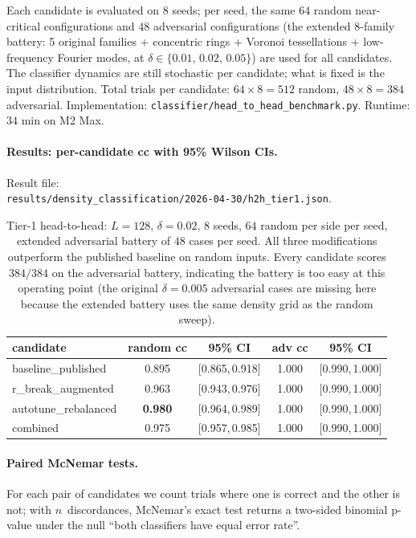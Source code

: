 \documentclass[11pt,a4paper]{article}
\newcommand{\fpath}[1]{\nolinkurl{#1}}
\begin{document}
Each candidate is evaluated on \(8\) seeds; per seed, the same
\(64\) random near-critical configurations and \(48\) adversarial
configurations (the extended 8-family battery: 5 original families +
concentric rings + Voronoi tessellations + low-frequency Fourier
modes, at \(\delta \in \{0.01,\,0.02,\,0.05\}\)) are used for all
candidates.  The classifier dynamics are still stochastic per
candidate; what is fixed is the input distribution.  Total trials per
candidate: \(64 \times 8 = 512\) random, \(48 \times 8 = 384\)
adversarial.  Implementation:
\fpath{classifier/head_to_head_benchmark.py}.  Runtime: \(34\) min
on M2 Max.

\paragraph{Results: per-candidate cc with 95\% Wilson CIs.}
Result file:\\
\fpath{results/density_classification/2026-04-30/h2h_tier1.json}.

\begin{table}[h]\centering\small
\begin{tabular}{l c c c c}
\toprule
candidate & random cc & 95\% CI & adv cc & 95\% CI \\
\midrule
baseline\_published       & 0.895 & [0.865,\,0.918] & 1.000 & [0.990,\,1.000] \\
r\_break\_augmented       & 0.963 & [0.943,\,0.976] & 1.000 & [0.990,\,1.000] \\
autotune\_rebalanced      & \textbf{0.980} & [0.964,\,0.989] & 1.000 & [0.990,\,1.000] \\
combined                  & 0.975 & [0.957,\,0.985] & 1.000 & [0.990,\,1.000] \\
\bottomrule
\end{tabular}
\caption{Tier-1 head-to-head: \(L=128,\,\delta=0.02\),
\(8\) seeds, \(64\) random per side per seed, extended adversarial
battery of \(48\) cases per seed.  All three modifications outperform
the published baseline on random inputs.  Every candidate scores
\(384/384\) on the adversarial battery, indicating the battery is too
easy at this operating point (the original \(\delta = 0.005\)
adversarial cases are missing here because the extended battery uses
the same density grid as the random sweep).}
\label{tab:h2h-tier1}
\end{table}

\paragraph{Paired McNemar tests.}
For each pair of candidates we count trials where one is correct and
the other is not; with \(n\)~discordances, McNemar's exact test
returns a two-sided binomial p-value under the null
``both classifiers have equal error rate''.
\end{document}

